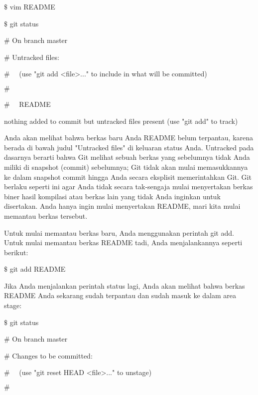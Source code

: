 \vspace{12pt}
\noindent 
 $  \$  $ vim README \par
\noindent 
 $  \$  $ git status \par
\noindent 
 $  \#  $ On branch master \par
\noindent 
 $  \#  $ Untracked files: \par
\noindent 
 $  \#  $~~ (use "git add <file>..." to include in what will be committed) \par
\noindent 
 $  \#  $ \par
\noindent 
 $  \#  $~~ README \par
\noindent 
nothing added to commit but untracked files present (use "git add" to track) \par
\noindent 
Anda akan melihat bahwa berkas baru Anda README belum terpantau, karena berada di bawah judul "Untracked files" di keluaran status Anda. Untracked pada dasarnya berarti bahwa Git melihat sebuah berkas yang sebelumnya tidak Anda miliki di snapshot (commit) sebelumnya; Git tidak akan mulai memasukkannya ke dalam snapshot commit hingga Anda secara eksplisit memerintahkan Git. Git berlaku seperti ini agar Anda tidak secara tak-sengaja mulai menyertakan berkas biner hasil kompilasi atau berkas lain yang tidak Anda inginkan untuk disertakan. Anda hanya ingin mulai menyertakan README, mari kita mulai memantau berkas tersebut. \par
\vspace{12pt}
\noindent 
Untuk mulai memantau berkas baru, Anda menggunakan perintah git add. Untuk mulai memantau berkas README tadi, Anda menjalankannya seperti berikut: \par
\vspace{12pt}
\noindent 
 $  \$  $ git add README \par
\vspace{12pt}
\noindent 
Jika Anda menjalankan perintah status lagi, Anda akan melihat bahwa berkas README Anda sekarang sudah terpantau dan sudah masuk ke dalam area stage: \par
\vspace{12pt}
\noindent 
 $  \$  $ git status \par
\noindent 
 $  \#  $ On branch master \par
\noindent 
 $  \#  $ Changes to be committed: \par
\noindent 
 $  \#  $~~ (use "git reset HEAD <file>..." to unstage) \par
\noindent 
 $  \#  $ \par
\noindent 
